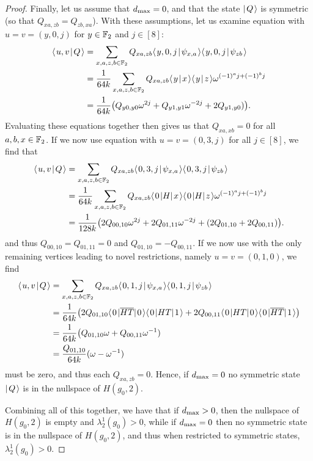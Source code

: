 \documentclass[../thesis-main/thesis-main]{subfiles}
\begin{document}
\begin{proof}
Finally, let us assume that $\dmax = 0$, and that the state $\ket{Q}$ is symmetric (so that $Q_{xa,zb} = Q_{zb,xa}$).  With these assumptions, let us examine equation  with $u=v = (y,0,j)$ for $y\in \FF_2$ and $j\in [8]$:
\begin{align}
  \braket{u,v}{Q} &= \sum_{x,a,z,b\in \FF_2} Q_{xa,zb} \braket{y,0,j}{\psi_{x,a}}\braket{y,0,j}{\psi_{zb}}\\
  &=\frac{1}{64 k} \sum_{x,a,z,b\in \FF_2} Q_{xa,zb} \braket{y}{x} \braket{y}{z} \omega^{(-1)^a j+ (-1)^b j}\\
  &= \frac{1}{64 k} \big(Q_{y0,y0}  \omega^{2j} + Q_{y1,y1} \omega^{-2j}+2 Q_{y1,y0} )\big).
\end{align}
Evaluating these equations together then gives us that $Q_{xa,xb} = 0$ for all $a,b,x \in \FF_2$.  If we now use equation  with $u=v=(0,3,j)$ for all $j\in [8]$, we find that
\begin{align}
  \braket{u,v}{Q} &= \sum_{x,a,z,b\in \FF_2} Q_{xa,zb} \braket{0,3,j}{\psi_{x,a}}\braket{0,3,j}{\psi_{zb}}\\
  &=\frac{1}{64 k} \sum_{x,a,z,b\in \FF_2} Q_{xa,zb} \bra{0}H \ket{x} \bra{0}H\ket{z} \omega^{(-1)^a j+ (-1)^b j}\\
  &= \frac{1}{128 k} \big(2 Q_{00,10}  \omega^{2j} + 2 Q_{01,11} \omega^{-2j}+(2 Q_{01,10} + 2 Q_{00,11} )\big).
\end{align}
and thus $Q_{00,10} = Q_{01,11} = 0$ and $Q_{01,10} = - Q_{00,11}$.  If we now use  with the only remaining vertices leading to novel restrictions, namely $u = v = (0,1,0)$, we find 
\begin{align}
  \braket{u,v}{Q} &= \sum_{x,a,z,b\in \FF_2} Q_{xa,zb} \braket{0,1,j}{\psi_{x,a}}\braket{0,1,j}{\psi_{zb}}\\
  &=\frac{1}{64 k} \big( 2 Q_{01,10}\bra{0} \overline{HT} \ket{0} \bra{0} HT \ket{1}  + 2 Q_{00,11} \bra{0}HT \ket{0} \bra{0} \overline{HT} \ket{1}\big)\\
  &= \frac{1}{64 k} \big( Q_{01,10} \omega + Q_{00,11} \omega^{-1})\\
  &= \frac{Q_{01,10}}{ 64 k} ( \omega - \omega^{-1})
\end{align}
must be zero, and thus each $Q_{xa,zb} = 0$.  Hence, if $\dmax = 0$ no symmetric state $\ket{Q}$ is in the nullspace of $H(g_0,2)$.  

Combining all of this together, we have that if $\dmax > 0$, then the nullspace of $H(g_0,2)$ is empty and $\lambda_2^1(g_0) > 0$, while if $\dmax = 0$ then no symmetric state is in the nullspace of $H(g_0,2)$, and thus when restricted to symmetric states, $\lambda_2^1(g_0) > 0$.
\end{proof}
\end{document}
